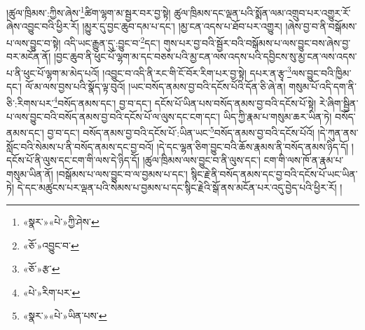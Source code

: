 །ཚུལ་ཁྲིམས་:ཀྱིས་ཞེས་\footnote{«སྣར་»«པེ་»ཀྱི་ཤེས་}ཚིག་ལྷག་མ་སྦྱར་བར་བྱ་སྟེ། ཚུལ་ཁྲིམས་དང་ལྡན་པའི་སྨོན་ལམ་འགྲུབ་པར་འགྱུར་རོ་ཞེས་འབྱུང་བའི་ཕྱིར་རོ། །མྱུར་དུ་བྱང་ཆུབ་དམ་པ་དང་། །མྱ་ངན་འདས་པ་ཐོབ་པར་འགྱུར། །ཞེས་བྱ་བ་ནི་བསྒོམས་པ་ལས་བྱུང་བ་སྟེ། འདི་ཡང་རྒྱུན་དུ་:བྱུང་བ་\footnote{«ཅོ་»འབྱུང་བ་}དང་། གུས་པར་བྱ་བའི་སྦྱོར་བའི་བསྒོམས་པ་ལས་བྱུང་བས་ཞེས་བྱ་བར་མངོན་ནོ། །བྱང་ཆུབ་ནི་ཕུང་པོ་ལྷག་མ་དང་བཅས་པའི་མྱ་ངན་ལས་འདས་པའི་དབྱིངས་སུ་མྱ་ངན་ལས་འདས་པ་ནི་ཕུང་པོ་ལྷག་མ་མེད་པའོ། །འབྱུང་བ་འདི་ནི་རང་གི་ངོ་བོར་རིག་པར་བྱ་སྟེ། དཔར་ན་རྩྭ་\footnote{«ཅོ་»རྩ་}ལས་བྱུང་བའི་ཁྱིམ་དང་། ལོ་མ་ལས་བྱས་པའི་སྣོད་ལྟ་བུའོ། །ཡང་བསོད་ནམས་བྱ་བའི་དངོས་པོའི་དོན་ཅི་ཞེ་ན། གསུམ་པོ་འདི་དག་ནི་ཅི་:རིགས་པར་\footnote{«པེ་»རིག་པར་}བསོད་ནམས་དང་། བྱ་བ་དང་། དངོས་པོ་ཡིན་པས་བསོད་ནམས་བྱ་བའི་དངོས་པོ་སྟེ། རེ་ཞིག་སྦྱིན་པ་ལས་བྱུང་བའི་བསོད་ནམས་བྱ་བའི་དངོས་པོ་ལ་ལུས་དང་ངག་དང་། ཡིད་ཀྱི་རྣམ་པ་གསུམ་ཆར་ཡིན་ཏེ། བསོད་ནམས་དང་། བྱ་བ་དང་། བསོད་ནམས་བྱ་བའི་དངོས་པོ་:ཡིན་ཡང་\footnote{«སྣར་»«པེ་»ཡིན་པས་}བསོད་ནམས་བྱ་བའི་དངོས་པོའོ། །དེ་ཀུན་ནས་སློང་བའི་སེམས་པ་ནི་བསོད་ནམས་དང་བྱ་བའོ། །དེ་དང་ལྷན་ཅིག་བྱུང་བའི་ཆོས་རྣམས་ནི་བསོད་ནམས་ཉིད་དོ། །དངོས་པོ་ནི་ལུས་དང་ངག་གི་ལས་དེ་ཉིད་དོ། །ཚུལ་ཁྲིམས་ལས་བྱུང་བ་ནི་ལུས་དང་། ངག་གི་ལས་ཁོ་ན་རྣམ་པ་གསུམ་ཡིན་ནོ། །བསྒོམས་པ་ལས་བྱུང་བ་ལ་བྱམས་པ་དང་། སྙིང་རྗེ་ནི་བསོད་ནམས་དང་བྱ་བའི་དངོས་པོ་ཡང་ཡིན་ཏེ། དེ་དང་མཚུངས་པར་ལྡན་པའི་སེམས་པ་བྱམས་པ་དང་སྙིང་རྗེའི་སྒོ་ནས་མངོན་པར་འདུ་བྱེད་པའི་ཕྱིར་རོ། །
